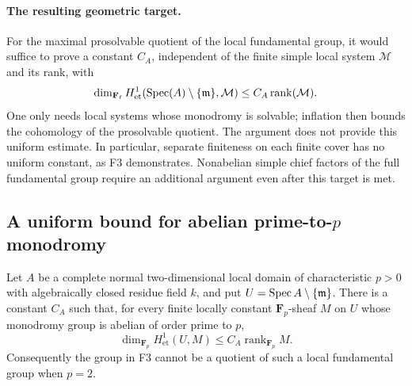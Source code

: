 \paragraph{The resulting geometric target.}
For the maximal prosolvable quotient of the local fundamental group,
it would suffice to prove a constant $C_A$, independent of the
finite simple local system $\mathcal M$ and its rank, with
\[
 \dim_{\mathbf F_\ell}H^1_{\mathrm{et}}
       (\operatorname{Spec}(A)\setminus\{\mathfrak m\},\mathcal M)
 \leq C_A\operatorname{rank}(\mathcal M).
\]
One only needs local systems whose monodromy is solvable; inflation
then bounds the cohomology of the prosolvable quotient. The argument
does not provide this uniform estimate. In particular, separate
finiteness on each finite cover has no uniform constant, as F3
demonstrates. Nonabelian simple chief factors of the full fundamental
group require an additional argument even after this target is met.

\subsection{A uniform bound for abelian prime-to-$p$ monodromy}

\begin{proposition}
Let $A$ be a complete normal two-dimensional local domain of
characteristic $p>0$ with algebraically closed residue field $k$,
and put $U=\operatorname{Spec} A\setminus\{\mathfrak m\}$. There is a constant
$C_A$ such that, for every finite locally constant
$\mathbf F_p$-sheaf $M$ on $U$ whose monodromy group is abelian
of order prime to $p$,
\[
 \dim_{\mathbf F_p}H^1_{\mathrm{et}}(U,M)
 \leq C_A\operatorname{rank}_{\mathbf F_p}M.
\]
Consequently the group in F3 cannot be a quotient of such a local
fundamental group when $p=2$.
\end{proposition}


